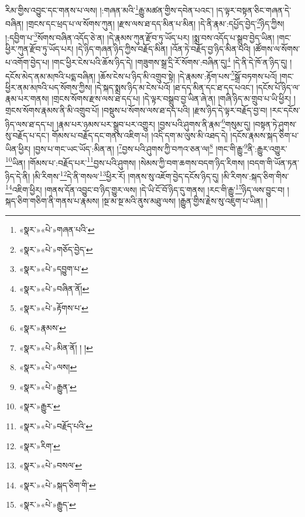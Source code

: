རིམ་གྱིས་འབྱུང་དང་གནས་པ་ལས། །:གཞན་མའི་\footnote{«སྣར་»«པེ་»གཞན་པའི་}རྒྱུ་མཚན་གྱིས་དབེན་པའང་། །ད་ལྟར་བསྟན་ཅིང་གཞན་དེ་བཞིན། །གྲངས་དང་ཕྲད་པ་ལ་སོགས་ཀུན། །རྫས་ལས་ཐ་དད་མིན་པ་མིན། །དེ་ནི་རྣམ་:དཔྱོད་བྱེད་\footnote{«སྣར་»«པེ་»གཅོད་བྱེད་}ཉིད་ཀྱིས། །:དབྱིག་པ་\footnote{«སྣར་»«པེ་»དབྱུག་པ་}སོགས་བཞིན་འདོད་ཅེ་ན། །དེ་རྣམས་ཀུན་རྫོབ་ཏུ་ཡོད་པར། །སྨྲ་བས་འདོད་པ་སྒྲུབ་བྱེད་ཡིན། །གང་ཕྱིར་ཀུན་རྫོབ་ཏུ་ཡོད་པར། །དེ་ཉིད་གཞན་ཉིད་ཀྱིས་བརྗོད་མིན། །འོན་ཏེ་བརྗོད་བྱ་ཉིད་མིན་པའི། །ཚོགས་ལ་སོགས་པ་འགོག་བྱེད་པ། །གང་ཕྱིར་ངེས་པའི་ཆོས་ཉིད་དེ། །གཟུགས་སྒྲ་དྲི་རོ་སོགས་:བཞིན་དུ།\footnote{«སྣར་»«པེ་»བཞིན་ནོ།} །དེ་ནི་དེ་ཁོ་ན་ཉིད་དུ། །དངོས་མེད་ནམ་མཁའི་པདྨ་བཞིན། །ཆོས་ངེས་པ་ཉིད་མི་འགྲུབ་སྟེ། །དེ་རྣམས་:རྟོག་པས་\footnote{«སྣར་»«པེ་»རྟོགས་པ་}སྒྲོ་བཏགས་པའོ། །གང་ཕྱིར་ནམ་མཁའི་པད་སོགས་ཀྱིས། །དེ་སྐད་སྨྲས་ཉིད་མ་ངེས་པའོ། །ཐ་དད་མིན་དང་ཐ་དད་པའང་། །དངོས་པོ་ཉིད་ལ་རྣམ་པར་གནས། །གྲངས་སོགས་རྫས་ལས་ཐ་དད་པ། །དེ་ལྟར་བསྒྲུབ་བྱ་ཡིན་ཞེ་ན། །གཞི་ཉིད་མ་གྲུབ་པ་ཡི་ཕྱིར། །གྲངས་སོགས་རྣམས་ནི་མི་འགྲུབ་པོ། །བསྡུས་པ་སོགས་ལས་ཐ་དད་པའི། །རྫས་ཉིད་དེ་ལྟར་བརྗོད་བྱ་བ། །རང་དངོས་ཉིད་ལས་ཐ་དད་པ། །རྣམ་པར་ཉམས་པར་སྒྲུབ་པར་འགྱུར། །བྱས་པའི་ཤུགས་ནི་རྣམ་\footnote{«སྣར་»རྣམས་}གསུམ་དུ། །བསྟན་ཏེ་ཤུགས་སུ་བརྗོད་པ་དང་། གོམས་པ་བརྗོད་དང་གནས་འཇིག་པ། །འདི་དག་མ་ལུས་མི་འཐད་དེ། །དངོས་རྣམས་སྐད་ཅིག་པ་ཡིན་ཕྱིར། །བྱས་པ་གང་ཡང་ཡོད་:མིན་ན། །\footnote{«སྣར་»«པེ་»མིན་ནོ། ། །}བྱས་པའི་ཤུགས་ཀྱི་བཀའ་ཅན་ལ།\footnote{«སྣར་»«པེ་»ལས།} །གང་གི་རྒྱུ་\footnote{«སྣར་»«པེ་»རྒྱུན་}ནི་:རྒྱུར་འགྱུར་\footnote{«སྣར་»རྒྱུར་}ཡིན། །གོམས་པ་:བརྗོད་པར་\footnote{«སྣར་»«པེ་»བརྗོད་པའི་}བྱས་པའི་ཤུགས། །སེམས་ཀྱི་བག་ཆགས་བདག་ཉིད་རིགས། །བདག་གི་ཡོན་ཏན་ཉིད་དེ་ནི། །མི་རིགས་\footnote{«སྣར་»རིག་}དེ་ནི་གསལ་\footnote{«སྣར་»«པེ་»བསལ་}ཕྱིར་རོ། །གནས་སུ་འཇོག་བྱེད་དངོས་ཉིད་དུ། །མི་རིགས་:སྐད་ཅིག་གིས་\footnote{«སྣར་»«པེ་»སྐད་ཅིག་གི་}འཇིག་ཕྱིར། །གནས་དོན་འབྱུང་བ་ཉིད་གྱུར་ལས། །དེ་ཡི་ངོ་བོ་ཉིད་དུ་གནས། །རང་གི་རྒྱུ་\footnote{«སྣར་»«པེ་»རྒྱུད་}ཉིད་ལས་བྱུང་བ། །སྐད་ཅིག་གཅིག་ནི་གནས་པ་རྣམས། །སྔ་མ་སྔ་མའི་ནུས་མཐུ་ལས། །རྒྱུན་གྱིས་རྗེས་སུ་འཇུག་པ་ཡིན། །
